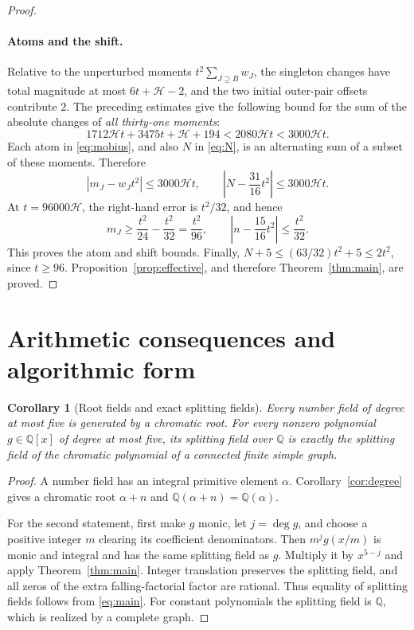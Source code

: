 \documentclass[11pt,a4paper]{article}
\newtheorem{corollary}[theorem]{Corollary}
\theoremstyle{definition}
\newcommand{\Q}{\mathbb Q}
\newcommand{\htf}{\mathcal H}
\begin{document}
\begin{proof}
\paragraph{Atoms and the shift.}
Relative to the unperturbed moments
$t^2\sum_{J\supseteq B}w_J$, the singleton changes have total magnitude
at most $6t+\htf-2$, and the two initial outer-pair offsets contribute $2$.
The preceding estimates give the following bound for the sum of the
absolute changes of \emph{all thirty-one moments}:
\begin{equation}\label{eq:totalerror}
 1712\htf t+3475t+\htf+194
 <2080\htf t<3000\htf t.
\end{equation}
Each atom in \eqref{eq:mobius}, and also $N$ in \eqref{eq:N}, is an
alternating sum of a subset of these moments. Therefore
\[
 |m_J-w_Jt^2|\le3000\htf t,\qquad
 \left|N-\frac{31}{16}t^2\right|\le3000\htf t.
\]
At $t=96000\htf$, the right-hand error is $t^2/32$, and hence
\[
 m_J\ge\frac{t^2}{24}-\frac{t^2}{32}=\frac{t^2}{96},
 \qquad
 \left|n-\frac{15}{16}t^2\right|\le\frac{t^2}{32}.
\]
This proves the atom and shift bounds.
Finally,
$N+5\le(63/32)t^2+5\le2t^2$, since $t\ge96$.
Proposition~\ref{prop:effective}, and therefore Theorem~\ref{thm:main},
are proved.
\end{proof}

\section{Arithmetic consequences and algorithmic form}\label{sec:corollaries}

\begin{corollary}[Root fields and exact splitting fields]\label{cor:fields}
Every number field of degree at most five is generated by a chromatic root.
For every nonzero polynomial $g\in\Q[x]$ of degree at most five, its splitting field
over $\Q$ is exactly the splitting field of the chromatic polynomial of
a connected finite simple graph.
\end{corollary}
\begin{proof}
A number field has an integral primitive element $\alpha$.
Corollary~\ref{cor:degree} gives a chromatic root $\alpha+n$ and
$\Q(\alpha+n)=\Q(\alpha)$.

For the second statement, first make $g$ monic, let $j=\deg g$, and choose
a positive integer $m$ clearing its coefficient denominators.
Then $m^j g(x/m)$ is monic and integral and has the same splitting field
as $g$. Multiply it by $x^{5-j}$ and apply Theorem~\ref{thm:main}.
Integer translation preserves the splitting field, and all zeros of the
extra falling-factorial factor are rational. Thus equality of splitting
fields follows from \eqref{eq:main}.
For constant polynomials the splitting field is $\Q$, which is realized
by a complete graph.
\end{proof}
\end{document}
